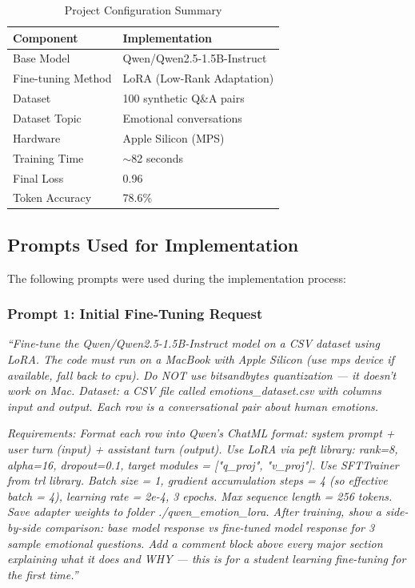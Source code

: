\documentclass[12pt,a4paper]{article}
\begin{document}
\begin{table}[H]
\centering
\caption{Project Configuration Summary}
\begin{tabular}{ll}
\toprule
\textbf{Component} & \textbf{Implementation} \\
\midrule
Base Model & Qwen/Qwen2.5-1.5B-Instruct \\
Fine-tuning Method & LoRA (Low-Rank Adaptation) \\
Dataset & 100 synthetic Q\&A pairs \\
Dataset Topic & Emotional conversations \\
Hardware & Apple Silicon (MPS) \\
Training Time & $\sim$82 seconds \\
Final Loss & 0.96 \\
Token Accuracy & 78.6\% \\
\bottomrule
\end{tabular}
\end{table}

\subsection{Prompts Used for Implementation}

The following prompts were used during the implementation process:

\subsubsection{Prompt 1: Initial Fine-Tuning Request}

\begin{tcolorbox}[colback=gray!5!white,colframe=gray!75!black,title=Prompt 1]
\small
\textit{``Fine-tune the Qwen/Qwen2.5-1.5B-Instruct model on a CSV dataset using LoRA. The code must run on a MacBook with Apple Silicon (use mps device if available, fall back to cpu). Do NOT use bitsandbytes quantization --- it doesn't work on Mac. Dataset: a CSV file called emotions\_dataset.csv with columns input and output. Each row is a conversational pair about human emotions.}

\textit{Requirements: Format each row into Qwen's ChatML format: system prompt + user turn (input) + assistant turn (output). Use LoRA via peft library: rank=8, alpha=16, dropout=0.1, target modules = ["q\_proj", "v\_proj"]. Use SFTTrainer from trl library. Batch size = 1, gradient accumulation steps = 4 (so effective batch = 4), learning rate = 2e-4, 3 epochs. Max sequence length = 256 tokens. Save adapter weights to folder ./qwen\_emotion\_lora. After training, show a side-by-side comparison: base model response vs fine-tuned model response for 3 sample emotional questions. Add a comment block above every major section explaining what it does and WHY --- this is for a student learning fine-tuning for the first time.''}
\end{tcolorbox}
\end{document}
